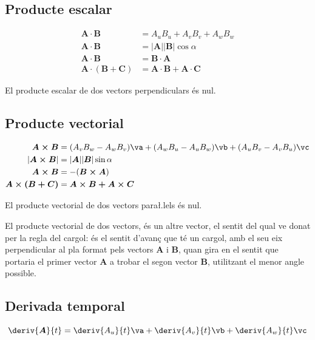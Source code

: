 \documentclass[catalan,a4paper,twoside,11pt]{article}
\begin{document}
\subsection{Producte escalar}
\vspace{-5mm}
\begin{align}
    \boldsymbol{A\cdot B} &= A_u B_u + A_v B_v + A_w B_w\\
    \boldsymbol{A\cdot B} &=|\boldsymbol{A}| |\boldsymbol{B}| \cos\alpha\\
    \boldsymbol{A\cdot B} &=\boldsymbol{B\cdot A}\\
    \boldsymbol{A\cdot(B+C)} &= \boldsymbol{A\cdot B+ A\cdot C}
\end{align}

El producte escalar de dos vectors perpendiculars  \'{e}s nul.

\subsection{Producte vectorial}
\vspace{-5mm}
\begin{align}
    \boldsymbol{A\times B} &= (A_v B_w - A_w B_v)\va + (A_w B_u - A_u B_w)\vb +
    (A_u B_v - A_v B_u)\vc \\
    |\boldsymbol{A\times B}| &=|\boldsymbol{A}| |\boldsymbol{B}| \sin\alpha\\
    \boldsymbol{A\times B} &=-(\boldsymbol{B\times A})\\
    \boldsymbol{A\times(B+C)} &= \boldsymbol{A\times B+ A\times C}
\end{align}

El producte vectorial de dos vectors para{\l.l}els  \'{e}s nul.

El producte vectorial de dos vectors, \'{e}s un altre vector, el
sentit del qual ve donat per la regla del cargol: \'{e}s el sentit
d'avan\c{c} que t\'{e} un cargol, amb el seu eix perpendicular al
pla format pels vectors  $\boldsymbol{A}$ i $\boldsymbol{B}$, quan
gira en el sentit que portaria el primer vector  $\boldsymbol{A}$ a
trobar el segon vector $\boldsymbol{B}$, utilitzant el menor angle
possible.

\subsection{Derivada temporal}
\begin{equation}
    \deriv{\boldsymbol{A}}{t} = \deriv{A_u}{t}\va +
    \deriv{A_v}{t}\vb + \deriv{A_w}{t}\vc
\end{equation}
\end{document}
